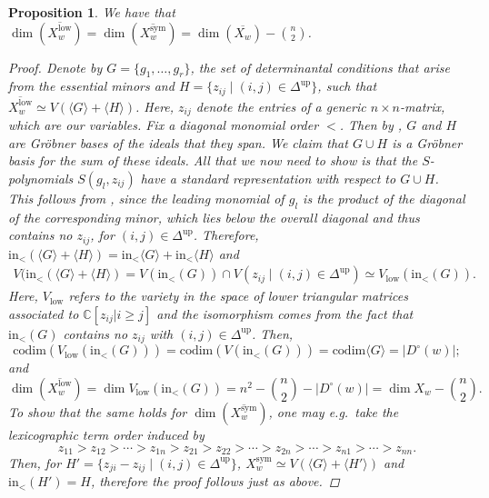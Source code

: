 \documentclass[11pt]{amsart}
\newtheorem{proposition}[theorem]{Proposition}
\theoremstyle{definition}
\theoremstyle{definition}
\theoremstyle{definition}
\theoremstyle{definition}
\newcommand{\Xw}{\overline{X_w}}
\newcommand{\Dc}{D^{\circ}}
\newcommand{\sym}{\mathrm{sym}}
\newcommand{\low}{\mathrm{low}}
\newcommand{\init}{\mathrm{in}}
\newcommand{\codim}{\mathrm{codim}}
\begin{document}
\begin{proposition}
We have that $\dim(\overline{ X^{\low}_w}) = \dim(\overline{ X^{\sym}_w})= \dim(\Xw) - {n\choose2}$.

\begin{proof}
Denote by $G = \{ g_1, \ldots, g_r \}$, the set of determinantal conditions that arise from the essential minors and $H = \{ z_{ij} \mid (i,j) \in \Delta^{\textrm{up}} \}$, such that $\overline {X_w^{\low}} \simeq V( \langle G \rangle + \langle H \rangle )$. Here, $z_{ij}$ denote the entries of a generic $n \times n$-matrix, which are our variables. Fix a diagonal monomial order $<$. Then by \cite[Theorem B]{knutson2005geometry}, $G$ and $H$ are Gröbner bases of the ideals that they span. We claim that $G \cup H$ is a Gröbner basis for the sum of these ideals. All that we now need to show is that the $S$-polynomials $S(g_l, z_{ij})$ have a standard representation with respect to $G \cup H$. This follows from \cite[Section 2.9, Proposition 4]{cox1997ideals}, since the leading monomial of $g_l$ is the product of the diagonal of the corresponding minor, which lies below the overall diagonal and thus contains no $z_{ij}$, for $(i,j) \in \Delta^{\textrm{up}}$. Therefore, $\init_{<}( \langle G \rangle + \langle H \rangle) = \init_{<} \langle G \rangle + \init_{<} \langle H \rangle$ and
\begin{align*}
V( \init_{<} ( \langle G \rangle + \langle H \rangle) = V( \init_{<}(G)) \cap V(z_{ij} \mid (i,j) \in \Delta^{\textrm{up}}) \simeq V_{\low}(\init_{<}(G)).
\end{align*}
Here, $V_{\low}$ refers to the variety in the space of lower triangular matrices associated to $\mathbb C[z_{ij} |i \geq j]$
and the isomorphism comes from the fact that $\init_{<}(G)$ contains no $z_{ij}$ with $(i,j) \in \Delta^{\textrm{up}}$. Then,
$$\codim (V_{\low}(\init_{<}(G))) = \codim (V( \init_{<}(G))) = \codim \langle G \rangle = |\Dc(w)|;$$
and
$$\dim(\overline{ X^{\low}_w}) = \dim V_{\low}(\init_{<}(G)) = n^2 - {n \choose 2} - |\Dc(w)| = \dim X_w - {n \choose 2}. 
$$
To show that the same holds for $\dim(\overline{ X^{\sym}_w})$, one may e.g.\ take the lexicographic term order induced by 
$$z_{11} > z_{12} > \cdots > z_{1n} > z_{21} > z_{22} > \cdots > z_{2n} > \cdots > z_{n1} > \cdots > z_{nn}.$$
Then, for $H' = \{ z_{ji} - z_{ij} \mid (i,j) \in \Delta^{\textrm{up}} \}$, $X_{w}^{\sym} \simeq V( \langle G \rangle + \langle H' \rangle )$ and $\init_{<}(H') = H$, therefore the proof follows just as above.
\end{proof}
\end{proposition}
\end{document}
